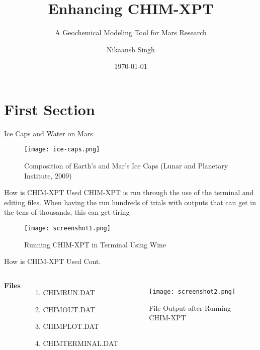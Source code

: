 \documentclass[aspectratio=169,xcolor=dvipsnames]{beamer}
\title[short title]{Enhancing CHIM-XPT} %
\subtitle{A Geochemical Modeling Tool for Mars Research}
\author[Nikaansh Singh] {Nikaansh Singh}
\institute[PSU] %
{
    Institute for Computing in Research \\
    Portland State University %
}
\date{\today} %
\begin{document}
\begin{frame}
    \titlepage
\end{frame}

\section{First Section}

\begin{frame}{Ice Caps and Water on Mars}
\begin{figure}
    \centering
    \texttt{[image: ice-caps.png]}
    \caption{Composition of Earth's and Mar's Ice Caps  (Lunar and Planetary Institute, 2009)}
    \label{fig:enter-label}
\end{figure}
\end{frame}


\begin{frame}{How is CHIM-XPT Used}
    CHIM-XPT is run through the use of the \alert{terminal and editing files}. When having the run hundreds of trials with outputs that can get in the tens of thousands, this can get tiring

\begin{figure}
    \centering
    \texttt{[image: screenshot1.png]}
    \caption{Running CHIM-XPT in Terminal Using Wine}
    \label{fig:enter-label}
\end{figure}
\end{frame}


\begin{frame}{How is CHIM-XPT Used Cont.}
    \begin{columns}[c] %

        \textbf{Files}
        \begin{enumerate}
            \item CHIMRUN.DAT
            \item CHIMOUT.DAT
            \item CHIMPLOT.DAT
            \item CHIMTERMINAL.DAT
        \end{enumerate}

        \begin{figure}
            \centering
            \texttt{[image: screenshot2.png]}
            \caption{File Output after Running CHIM-XPT}
            \label{fig:enter-label}
        \end{figure}
        
    \end{columns}
\end{frame}
\end{document}
